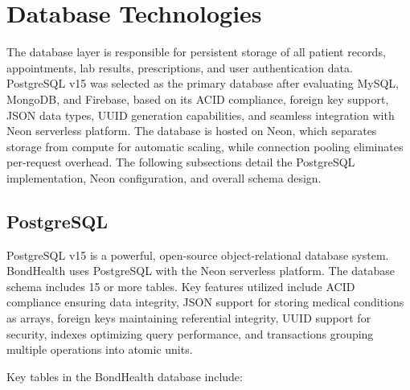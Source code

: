 \section{Database Technologies}

\justifying
\noindent The database layer is responsible for persistent storage of all patient records, appointments, lab results, prescriptions, and user authentication data. PostgreSQL v15 was selected as the primary database after evaluating MySQL, MongoDB, and Firebase, based on its ACID compliance, foreign key support, JSON data types, UUID generation capabilities, and seamless integration with Neon serverless platform. The database is hosted on Neon, which separates storage from compute for automatic scaling, while connection pooling eliminates per-request overhead. The following subsections detail the PostgreSQL implementation, Neon configuration, and overall schema design.

\subsection{PostgreSQL}

\justifying
\noindent PostgreSQL v15 is a powerful, open-source object-relational database system. BondHealth uses PostgreSQL with the Neon serverless platform. The database schema includes 15 or more tables. Key features utilized include ACID compliance ensuring data integrity, JSON support for storing medical conditions as arrays, foreign keys maintaining referential integrity, UUID support for security, indexes optimizing query performance, and transactions grouping multiple operations into atomic units.

\noindent Key tables in the BondHealth database include:

